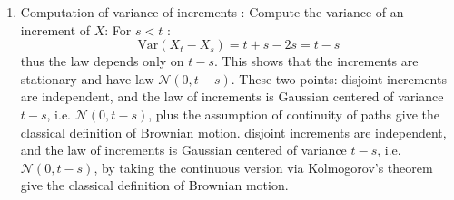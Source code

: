 \begin{parts}
\begin{xsolution}
\begin{enumerate}
       Using property ${\rm Cov}(X_s,X_t)=\inf(s,t).$
       Compute $\text{Cov}(X_t - X_s, X_v - X_u)$
       for \(s < t \leq u < v\).
       \[
       \text{Cov}(X_t - X_s, X_v - X_u) = \min(t,v) - \min(t,u) - \min(s,v) + \min(s,u)
       \]
       This always gives 0, proving that 
       disjoint increments are uncorrelated, hence independent 
       (since Gaussian vector).
    \item Computation of variance of increments :  
       Compute the variance of an increment of $X$:
       For \(s < t\) :
       \[
       \text{Var}(X_t - X_s) = t + s - 2s = t - s
       \]
       thus the law depends only on \(t-s\).
       This shows that the increments are stationary 
       and have law \(\mathcal{N}(0, t-s)\).
    These two points:
    disjoint increments are independent, and
    the law of increments is Gaussian centered of variance $t-s$, i.e. \(\mathcal{N}(0, t-s)\),
    plus the assumption of continuity of paths
    give 
    the classical definition of Brownian motion.
    disjoint increments are independent, and
    the law of increments is Gaussian centered of variance $t-s$, i.e. \(\mathcal{N}(0, t-s)\),
    by taking the continuous version via Kolmogorov's theorem
    give 
    the classical definition of Brownian motion.
    \end{enumerate}
    \end{xsolution}


\end{parts}
